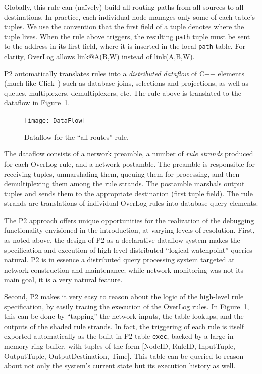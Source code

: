 \documentclass[10pt,twocolumn]{article}
\def\Sys{P2\xspace}
\def\Lang{OverLog\xspace}
\newcommand{\ol}[1]{{\tt\footnotesize#1}}
\begin{document}
Globally, this rule can (na\"ively) build
all routing paths 
from all sources to all destinations.  In practice, each individual node
manages only some of each table's tuples.  We 
use the convention that the first field of a tuple denotes where
the tuple lives. When the rule above triggers, the resulting \ol{path}
tuple must be sent to the address in its first field,
where it is inserted in the local \ol{path} table.  For clarity, \Lang
allows link@A(B,W) instead of link(A,B,W).

\Sys automatically translates rules into a
\emph{distributed dataflow} of C++ elements
(much like Click~\cite{click-tocs}) such
as database joins, selections and projections, as well as queues,
multiplexers, demultiplexers, etc.  The rule above is translated to
the dataflow in Figure~\ref{fig:DataFlow}. 
\begin{figure}
\centerline{\texttt{[image: DataFlow]}}
\caption{Dataflow for the ``all routes'' rule.}
\label{fig:DataFlow}
\end{figure}
The dataflow consists of a network preamble, a number of \emph{rule
strands} produced for each \Lang rule, and a network postamble.  The
preamble is responsible for receiving tuples, unmarshaling them,
queuing them for processing, and then demultiplexing them among the
rule strands. The postamble marshals output tuples and 
sends them to the appropriate destination (first tuple
field). The rule strands are translations of individual \Lang rules
into database query elements.

The \Sys approach offers unique opportunities for the realization of
the debugging functionality envisioned in the introduction, at varying
levels of resolution.  First, as noted above, the design of \Sys as a
declarative dataflow system makes the specification and execution of
high-level distributed ``logical watchpoint'' queries natural.  \Sys
is in essence a distributed query processing system targeted at
network construction and maintenance; while network
monitoring was not its main goal, it is a very natural feature.

Second, \Sys makes it very easy to reason about the logic of the
high-level rule specification, by easily tracing the execution of the
\Lang rules.  In Figure~\ref{fig:DataFlow}, this can be done by
``tapping'' the network inputs, the table lookups, and the outputs of
the shaded rule strands.  In fact, the triggering of each rule is
itself exported automatically as the built-in \Sys table
\ol{exec}, backed by a large in-memory ring buffer, with tuples of the form [NodeID, RuleID, InputTuple,
OutputTuple, OutputDestination, Time].  This table can be queried to
reason about not only the system's current state but its execution
history as well.
\end{document}

